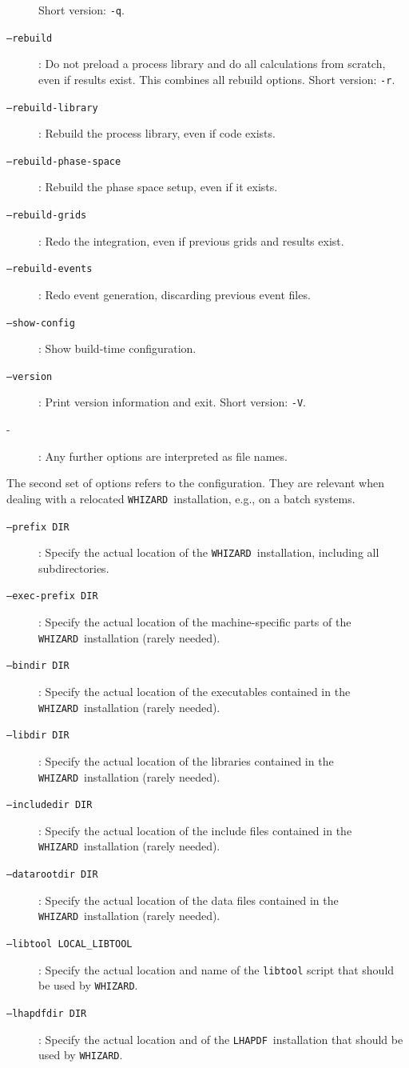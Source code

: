 \documentclass[12pt]{book}
\newcommand{\ttt}[1]{\texttt{#1}}
\newcommand{\whizard}{\ttt{WHIZARD}}
\newcommand{\lhapdf}{\ttt{LHAPDF}}
\begin{document}
\begin{description}
  Short version: \ttt{-q}.
\item[\ttt{--rebuild}]: Do not preload a process library and do all
  calculations from scratch, even if results exist.  This combines all
  rebuild options.  Short version: \ttt{-r}.
\item[\ttt{--rebuild-library}]: Rebuild the process library, even if code
  exists.
\item[\ttt{--rebuild-phase-space}]: Rebuild the phase space setup, even if
  it exists.
\item[\ttt{--rebuild-grids}]: Redo the integration, even if previous grids
  and results exist.
\item[\ttt{--rebuild-events}]: Redo event generation, discarding previous
  event files.
\item[\ttt{--show-config}]: Show build-time configuration.
\item[\ttt{--version}]: Print version information and exit.  Short version:
  \ttt{-V}.
\item[-]: Any further options are interpreted as file names.
\end{description}
The second set of options refers to the configuration.  They are
relevant when dealing with a relocated \whizard\ installation, e.g.,
on a batch systems.
\begin{description}
\item[\ttt{--prefix DIR}]: Specify the actual location of the \whizard\
  installation, including all subdirectories.
\item[\ttt{--exec-prefix DIR}]:  Specify the actual location of the
  machine-specific parts of the \whizard\ installation (rarely needed).
\item[\ttt{--bindir DIR}]:  Specify the actual location of the
  executables contained in the \whizard\ installation (rarely needed).
\item[\ttt{--libdir DIR}]:  Specify the actual location of the
  libraries contained in the \whizard\ installation (rarely needed).
\item[\ttt{--includedir DIR}]:  Specify the actual location of the
  include files contained in the \whizard\ installation (rarely needed).
\item[\ttt{--datarootdir DIR}]:  Specify the actual location of the
  data files contained in the \whizard\ installation (rarely needed).
\item[\ttt{--libtool LOCAL\_LIBTOOL}]:  Specify the actual location and
  name of the \ttt{libtool} script that should be used by \whizard.
\item[\ttt{--lhapdfdir DIR}]:  Specify the actual location and
  of the \lhapdf\ installation that should be used by \whizard.
\end{description}
\end{document}
